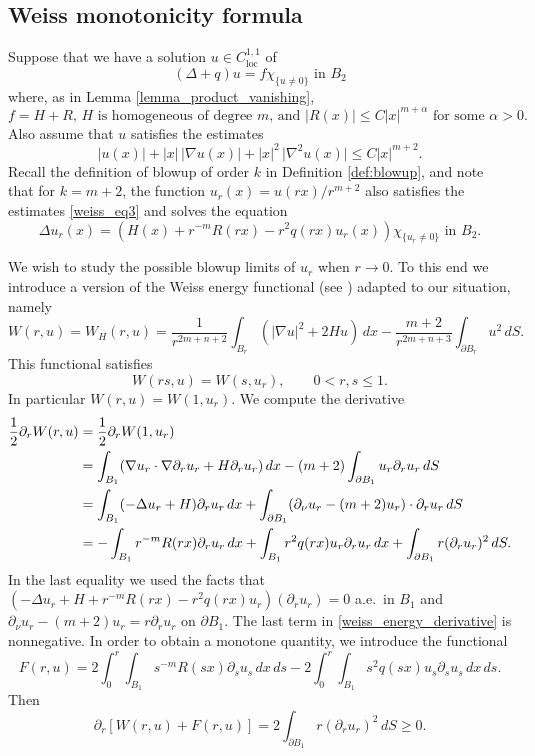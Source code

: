 \documentclass[11pt,a4paper]{amsart}
\theoremstyle{definition}
\numberwithin{equation}{section}
\newcommand{\abs}[1]{\lvert #1 \rvert}          %
\newcommand{\p}{\partial}
\begin{document}
\subsection{Weiss monotonicity formula}

Suppose that we have a solution $u \in C^{1,1}_{\mathrm{loc}}$ of 
\begin{equation} \label{weiss_eq1}
(\Delta + q) u = f \chi_{\{ u \neq 0 \}} \text{ in $B_2$}
\end{equation}
where, as in Lemma \ref{lemma_product_vanishing},  
\begin{equation} \label{weiss_eq2}
\text{$f = H + R$, $H$ is homogeneous of degree $m$, and $\abs{R(x)} \leq C \abs{x}^{m+\alpha}$ for some $\alpha > 0$.}
\end{equation}
Also assume that $u$ satisfies the estimates 
\begin{equation} \label{weiss_eq3}
\abs{u(x)} + \abs{x} \, \abs{\nabla u(x)} + \abs{x}^2 \, \abs{\nabla^2 u(x)} \leq C \abs{x}^{m+2}.
\end{equation}
Recall the definition of blowup of order $k$ in Definition \ref{def:blowup},  and note that for  $k=m+2$, the function $u_r(x) = u(rx)/r^{m+2}$ also satisfies the estimates \eqref{weiss_eq3} and solves the equation 
\[
\Delta u_r(x) = (H(x) + r^{-m} R(rx) - r^2 q(rx) u_r(x)) \chi_{\{ u_r \neq 0 \}} \text{ in $B_2$}.
\]

We wish to study the possible blowup limits of $u_r$ when $r \to 0$. To this end we introduce a version of the Weiss energy functional (see \cite[\S3.5]{PSU}) adapted to our situation, namely 
\[
W(r, u) = W_H(r,u) = \frac{1}{r^{2m+n+2}}\int_{B_r} (\abs{\nabla u}^2 + 2 H u) \,dx - \frac{m+2}{r^{2m+n+3}} \int_{\p B_r} u^2 \,dS.
\]
This functional satisfies  
\[
W(rs, u) = W(s, u_r), \qquad 0 < r, s \leq 1.
\]
In particular $W(r,u) = W(1,u_r)$. We compute the derivative 
\begin{align}
\frac{1}{2} \p_r W(r,u) &= \frac{1}{2} \p_r W(1,u_r) \notag \\
 &= \int_{B_1} (\nabla u_r \cdot \nabla \p_r u_r + H \p_r u_r) \,dx - (m+2) \int_{\p B_1} u_r \p_r u_r \,dS \notag \\
 &= \int_{B_1} (-\Delta u_r + H) \p_r u_r \,dx + \int_{\p B_1} (\p_{\nu} u_r - (m+2) u_r) \cdot \p_r u_r \,dS \notag \\
 &= - \int_{B_1} r^{-m} R(rx) \p_r u_r \,dx + \int_{B_1} r^2 q(rx) u_r \p_r u_r \,dx + \int_{\p B_1} r (\p_r u_r)^2 \,dS. \label{weiss_energy_derivative}
\end{align}
In the last equality we used the facts that $(-\Delta u_r + H + r^{-m}R(rx)- r^2 q(rx) u_r)(\p_r u_r) = 0$ a.e.\ in $B_1$ and $\p_{\nu} u_r - (m+2) u_r = r \p_r u_r$ on $\p B_1$. The last term in \eqref{weiss_energy_derivative} is nonnegative. In order to obtain a monotone quantity, we introduce the functional 
\[
F(r,u) = 2 \int_0^r \int_{B_1} s^{-m} R(sx) \p_s u_s \,dx \,ds - 2 \int_0^r \int_{B_1} s^2 q(sx) u_s \p_s u_s \,dx \,ds.
\]
Then  
\[
\p_r \left[ W(r,u) + F(r,u) \right] = 2 \int_{\p B_1} r (\p_r u_r)^2 \,dS \geq 0.
\]
\end{document}
